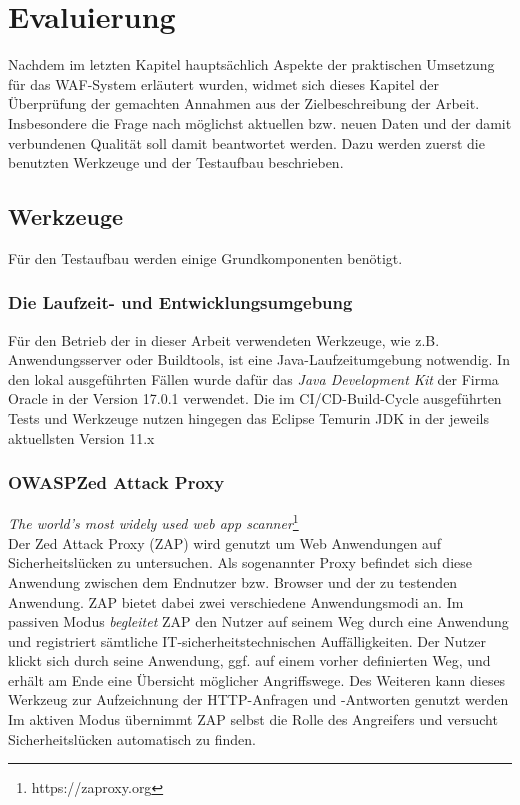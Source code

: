 \chapter{Evaluierung}


Nachdem im letzten Kapitel hauptsächlich Aspekte der praktischen Umsetzung für das WAF-System erläutert wurden, widmet sich dieses Kapitel der Überprüfung der gemachten Annahmen aus der Zielbeschreibung der Arbeit. Insbesondere die Frage nach möglichst aktuellen bzw. neuen Daten und der damit verbundenen Qualität soll damit beantwortet werden. Dazu werden zuerst die benutzten Werkzeuge und der Testaufbau beschrieben. 

\section{Werkzeuge}
Für den Testaufbau werden einige Grundkomponenten benötigt. 

\subsection{Die Laufzeit- und Entwicklungsumgebung}
Für den Betrieb der in dieser Arbeit verwendeten Werkzeuge, wie z.B. Anwendungsserver oder Buildtools, ist eine Java-Laufzeitumgebung notwendig. In den lokal ausgeführten Fällen wurde dafür das \emph{Java Development Kit} der Firma Oracle in der Version 17.0.1 verwendet. Die im CI/CD-Build-Cycle ausgeführten Tests und Werkzeuge nutzen hingegen das Eclipse Temurin JDK in der jeweils aktuellsten Version 11.x


\subsection{OWASP\textregistered  Zed Attack Proxy}
\label{ref:zap}

\emph{The world's most widely used web app scanner}\footnote{https://zaproxy.org}\\

Der Zed Attack Proxy (ZAP) wird genutzt um Web Anwendungen auf Sicherheitslücken zu untersuchen. Als sogenannter Proxy befindet sich diese Anwendung zwischen dem Endnutzer bzw. Browser und der zu testenden Anwendung. ZAP bietet dabei zwei verschiedene Anwendungsmodi an. Im passiven Modus \emph{begleitet} ZAP den Nutzer auf seinem Weg durch eine Anwendung und registriert sämtliche IT-sicherheitstechnischen Auffälligkeiten. Der Nutzer klickt sich durch seine Anwendung, ggf. auf einem vorher definierten Weg,  und erhält am Ende eine Übersicht möglicher Angriffswege. Des Weiteren kann dieses Werkzeug zur Aufzeichnung der HTTP-Anfragen und -Antworten genutzt werden\\ Im aktiven Modus übernimmt ZAP selbst die Rolle des Angreifers und versucht Sicherheitslücken automatisch zu finden. \\

